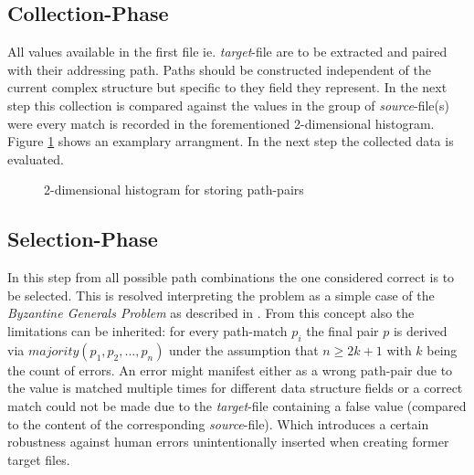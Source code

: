 \documentclass[conference]{IEEEtran}
\begin{document}
\subsection{Collection-Phase}
All values available in the first file ie. \textit{target}-file are to be extracted and
paired with their addressing path. Paths should be constructed independent of the current
complex structure but specific to they field they represent. In the next step this
collection is compared against the values in the group of \textit{source}-file(s) were
every match is recorded in the forementioned 2-dimensional histogram. Figure
\ref{classifier_table} shows an examplary arrangment. In the next step the collected data
is evaluated.
\begin{figure}[h]
  \centering
 \caption{2-dimensional histogram for storing path-pairs}
 \label{classifier_table}
\end{figure}

\subsection{Selection-Phase}
In this step from all possible path combinations the one considered correct is to be selected.
This is resolved interpreting the problem as a simple case of the \textit{Byzantine Generals
Problem} as described in \cite{lamport:byzantine}. From this concept also the limitations can
be inherited: for every path-match $p_i$ the final pair $p$ is derived via
$majority(p_1, p_2, ...,p_n)$ under the assumption that $n \geq 2k + 1$ with $k$ being the
count of errors. An error might manifest either as a wrong path-pair due to the value is
matched multiple times for different data structure fields or a correct match could not be
made due to the \textit{target}-file containing a false value (compared to the content of
the corresponding \textit{source}-file). Which introduces a certain robustness against
human errors unintentionally inserted when creating former target files.
\end{document}
